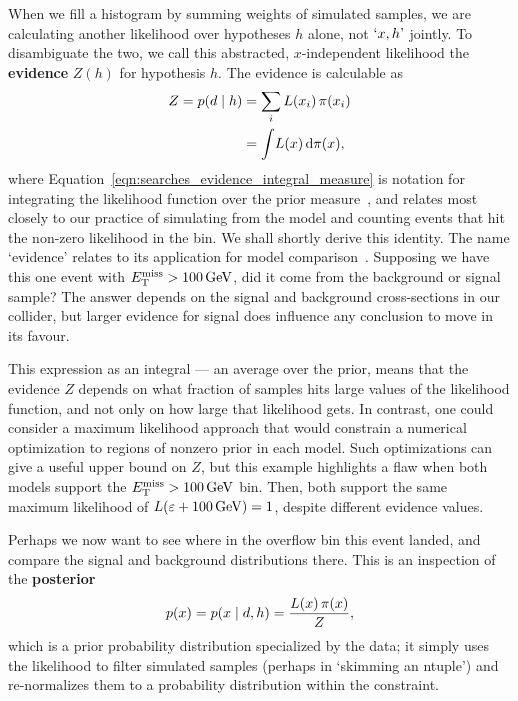 When we fill a histogram by summing weights of simulated samples, we are
calculating another likelihood over hypotheses $h$ alone, not $`x, h\textrm{'}$
jointly.
To disambiguate the two, we call this abstracted, $x$-independent likelihood
the \textbf{evidence} $Z(h)$ for hypothesis $h$.
The evidence is calculable as
\begin{align}
Z
= \prob{d}{h} &= \sum_i L(x_i) \,\pi(x_i)
\label{eqn:searches_evidence_integral_sum}
\\
&= \int\! L(x) \,\mathrm{d}\pi(x),
\label{eqn:searches_evidence_integral_measure}
\end{align}
where Equation~\ref{eqn:searches_evidence_integral_measure} is notation for
integrating the likelihood function over the prior measure~\cite{
billingsley2008probability,
skilling2010foundations
}, and relates most closely to our practice of simulating from the model and
counting events that hit the non-zero likelihood in the bin.
We shall shortly derive this identity.
The name `evidence' relates to its application for model
comparison~\cite{mackay2003information}.
Supposing we have this one event with $\met > 100\,\eV[G]$, did it come from
the background or signal sample?
The answer depends on the signal and background cross-sections in our collider,
but larger evidence for signal does influence any conclusion to move in its
favour.

This expression as an integral --- an average over the prior, means that
the evidence $Z$ depends on what fraction of samples hits large values of
the likelihood function, and not only on how large that likelihood gets.
In contrast, one could consider a maximum likelihood approach that would
constrain a numerical optimization to regions of nonzero prior in each model.
Such optimizations can give a useful upper bound on $Z$, but this example
highlights a flaw when both models support the $\met > 100\,\eV[G]$ bin.
Then, both support the same maximum likelihood of
$L(\varepsilon + 100\,\eV[G]) = 1$, despite different evidence values.

Perhaps we now want to see where in the overflow bin this event landed, and
compare the signal and background distributions there.
This is an inspection of the \textbf{posterior}
\begin{equation}
p(x) = \prob{x}{d, h} = \frac{L(x)\,\pi(x)}{Z},
\end{equation}
which is a prior probability distribution specialized by the data;
it simply uses the likelihood to filter simulated samples
(perhaps in `skimming an ntuple')
and re-normalizes them to a probability distribution within the constraint.

